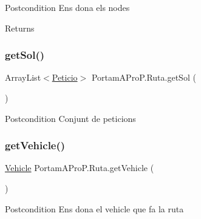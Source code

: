 \begin{DoxyPostcond}{Postcondition}
Ens dona els nodes 
\end{DoxyPostcond}
\begin{DoxyReturn}{Returns}

\end{DoxyReturn}
\mbox{\label{class_portam_a_pro_p_1_1_ruta_a996ba51c71a91919b99c1df56bb6d0ad}} 
\subsubsection{\texorpdfstring{get\+Sol()}{getSol()}}
{\footnotesize\ttfamily Array\+List$<$\hyperlink{class_portam_a_pro_p_1_1_peticio}{Peticio}$>$ Portam\+A\+Pro\+P.\+Ruta.\+get\+Sol (\begin{DoxyParamCaption}{ }\end{DoxyParamCaption})}

\begin{DoxyPostcond}{Postcondition}
Conjunt de peticions 
\end{DoxyPostcond}
\mbox{\label{class_portam_a_pro_p_1_1_ruta_a66aba8b89762ddc8df0a3bb3741ece40}} 
\subsubsection{\texorpdfstring{get\+Vehicle()}{getVehicle()}}
{\footnotesize\ttfamily \hyperlink{class_portam_a_pro_p_1_1_vehicle}{Vehicle} Portam\+A\+Pro\+P.\+Ruta.\+get\+Vehicle (\begin{DoxyParamCaption}{ }\end{DoxyParamCaption})}

\begin{DoxyPostcond}{Postcondition}
Ens dona el vehicle que fa la ruta 
\end{DoxyPostcond}
\mbox{\label{class_portam_a_pro_p_1_1_ruta_af6470e14e390b3394c084cbbec33cd7f}} 
